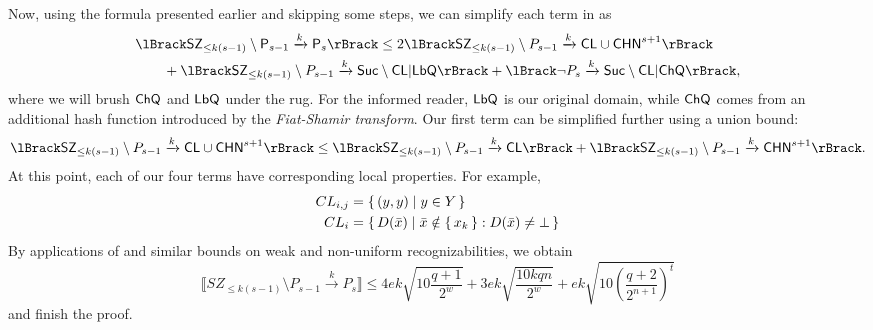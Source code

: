 Now, using the formula presented earlier and skipping some steps,
we can simplify each term in  as
\begin{align*}
	&\lBrack \SZ_{\leq k(s-1)}\setminus \sfP_{s-1}\xrightarrow{k} \sfP_s\rBrack 
	\leq
	2\lBrack \SZ_{\leq k(s-1)}\setminus P_{s-1}\xrightarrow{k} \CL\cup \CHN^{s+1}\rBrack  \\
	&\qquad+\lBrack \SZ_{\leq k(s-1)}\setminus P_{s-1}\xrightarrow{k} \Suc\setminus{\CL} | \LbQ\rBrack 
	+\lBrack \neg P_s\xrightarrow{k} \Suc\setminus\CL|\ChQ\rBrack,
\end{align*}
where we will brush $\mathsf{ChQ}$ and $\mathsf{LbQ}$ under the rug.
For the informed reader, $\mathsf{LbQ}$ is our original domain, while $\mathsf{ChQ}$ comes from an additional hash function introduced by the \emph{Fiat-Shamir transform}.
Our first term can be simplified further using a union bound:
\begin{align*}
	\lBrack \SZ_{\leq k(s-1)}\setminus P_{s-1}\xrightarrow{k} \CL\cup \CHN^{s+1}\rBrack
	\leq
	\lBrack \SZ_{\leq k(s-1)}\setminus P_{s-1}\xrightarrow{k} \CL\rBrack
	+
	\lBrack \SZ_{\leq k(s-1)}\setminus P_{s-1}\xrightarrow{k} \CHN^{s+1}\rBrack.
\end{align*}
At this point, each of our four terms have corresponding local properties. For example,
\begin{align*}
	CL_{i,j}&=\set{(y, y)|y\in Y}\\
	CL_i&=\set{D(\bar{x})|\bar{x}\notin\set{x_k}:D(\bar{x})\ne\bot}
\end{align*}
By applications of  and similar bounds on weak and non-uniform recognizabilities,
we obtain
$$
\lBrack SZ_{\leq k(s-1)}\setminus P_{s-1}\xrightarrow{k} P_s\rBrack
	\leq 4ek\sqrt{10\frac{q+1}{2^w}}
	+3ek\sqrt{\frac{10kqn}{2^w}}
	+ek\sqrt{10\left(\frac{q+2}{2^{n+1}}\right)^t}
$$
and finish the proof.

